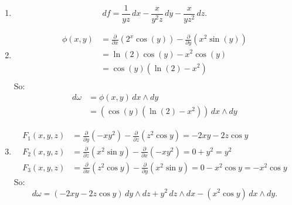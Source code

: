 \documentclass[11pt]{article}
\begin{document}
\begin{solution}
	\begin{enumerate}
		\item
		      $$
			      df = \frac{1}{yz} \, dx - \frac{x}{y^2z} \, dy - \frac{x}{yz^2} \, dz.
		      $$
		\item
		      $$
			      \begin{aligned}
				      \phi(x, y) & = \frac{\partial}{\partial x}(2^x \cos(y)) - \frac{\partial}{\partial y}(x^2 \sin(y)) \\
				                 & = \ln(2) \cos(y) - x^2 \cos(y)                                                        \\
				                 & = \cos(y) \left( \ln(2) - x^2 \right)                                                 \\
			      \end{aligned}
		      $$
		      So:
		      $$
			      \begin{aligned}
				      d\omega & = \phi(x,y) \, dx \wedge dy                                          \\
				              & = \left( \cos(y) \left( \ln(2) - x^2 \right) \right) \, dx \wedge dy
			      \end{aligned}
		      $$
		\item
		      $$
			      \begin{aligned}
				      F_1(x,y,z) & = \frac{\partial}{\partial y}(-xy^2) - \frac{\partial}{\partial z}(z^2 \cos y) = -2xy - 2z \cos y                  \\
				      F_2(x,y,z) & = \frac{\partial}{\partial z}(x^2 \sin y) - \frac{\partial}{\partial x}(-xy^2) = 0 + y^2 = y^2                     \\
				      F_3(x,y,z) & = \frac{\partial}{\partial x}(z^2 \cos y) - \frac{\partial}{\partial y}(x^2 \sin y) = 0 - x^2 \cos y = -x^2 \cos y
			      \end{aligned}
		      $$
		      So:
		      $$
			      d\omega = (-2xy - 2z \cos y) \, dy \wedge dz + y^2 \, dz \wedge dx - (x^2 \cos y) \, dx \wedge dy.
		      $$
	\end{enumerate}
\end{solution}
\end{document}
